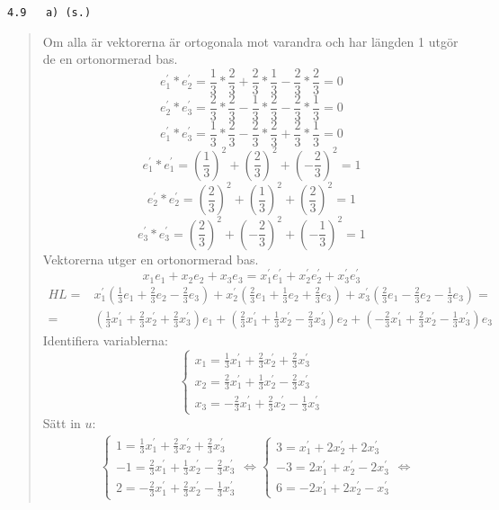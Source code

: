 \documentclass[a4paper]{article}
\newcommand{\tskcol}[1]{\textcolor{tskcol}{#1}}
\begin{document}
\pagebreak
\texttt{\tskcol{4.9~~~a) (s.)}}
\begin{quotation}
	\noindent
	Om alla är vektorerna är ortogonala mot varandra och har längden 1 utgör de en ortonormerad bas.
	\[e^{'}_1*e^{'}_2=\frac{1}{3}*\frac{2}{3}+\frac{2}{3}*\frac{1}{3}-\frac{2}{3}*\frac{2}{3}=0\]
	\[e^{'}_2*e^{'}_3=\frac{2}{3}*\frac{2}{3}-\frac{1}{3}*\frac{2}{3}-\frac{2}{3}*\frac{1}{3}=0\]
	\[e^{'}_1*e^{'}_3=\frac{1}{3}*\frac{2}{3}-\frac{2}{3}*\frac{2}{3}+\frac{2}{3}*\frac{1}{3}=0\]
	\[e^{'}_1*e^{'}_1=\left(\frac{1}{3}\right)^2+\left(\frac{2}{3}\right)^2+\left(-\frac{2}{3}\right)^2=1\]
	\[e^{'}_2*e^{'}_2=\left(\frac{2}{3}\right)^2+\left(\frac{1}{3}\right)^2+\left(\frac{2}{3}\right)^2=1\]
	\[e^{'}_3*e^{'}_3=\left(\frac{2}{3}\right)^2+\left(-\frac{2}{3}\right)^2+\left(-\frac{1}{3}\right)^2=1\]
	Vektorerna utger en ortonormerad bas.
	\[x_1e_1+x_2e_2+x_3e_3=x^{'}_1e^{'}_1+x^{'}_2e^{'}_2+x^{'}_3e^{'}_3\]
	\begin{align*}
	HL=&
	x^{'}_1(\frac{1}{3}e_1+\frac{2}{3}e_2-\frac{2}{3}e_3)+
	x^{'}_2(\frac{2}{3}e_1+\frac{1}{3}e_2+\frac{2}{3}e_3)+
	x^{'}_3(\frac{2}{3}e_1-\frac{2}{3}e_2-\frac{1}{3}e_3)= \\ =
	&(\frac{1}{3}x^{'}_1+\frac{2}{3}x^{'}_2+\frac{2}{3}x^{'}_3)e_1+
	(\frac{2}{3}x^{'}_1+\frac{1}{3}x^{'}_2-\frac{2}{3}x^{'}_3)e_2+
	(-\frac{2}{3}x^{'}_1+\frac{2}{3}x^{'}_2-\frac{1}{3}x^{'}_3)e_3
	\end{align*}
	Identifiera variablerna:
	\[\begin{cases}
	x_1=\frac{1}{3}x^{'}_1+\frac{2}{3}x^{'}_2+\frac{2}{3}x^{'}_3 \\
	x_2=\frac{2}{3}x^{'}_1+\frac{1}{3}x^{'}_2-\frac{2}{3}x^{'}_3 \\
	x_3=-\frac{2}{3}x^{'}_1+\frac{2}{3}x^{'}_2-\frac{1}{3}x^{'}_3
	\end{cases}\]
	Sätt in $u$:
	\begin{align*}
	&\begin{cases}
	1=\frac{1}{3}x^{'}_1+\frac{2}{3}x^{'}_2+\frac{2}{3}x^{'}_3 \\
	-1=\frac{2}{3}x^{'}_1+\frac{1}{3}x^{'}_2-\frac{2}{3}x^{'}_3 \\
	2=-\frac{2}{3}x^{'}_1+\frac{2}{3}x^{'}_2-\frac{1}{3}x^{'}_3
	\end{cases} \Leftrightarrow
	\begin{cases}
	3=x^{'}_1+2x^{'}_2+2x^{'}_3 \\
	-3=2x^{'}_1+x^{'}_2-2x^{'}_3 \\
	6=-2x^{'}_1+2x^{'}_2-x^{'}_3
	\end{cases} \Leftrightarrow

\end{align*}
\end{quotation}
\end{document}
